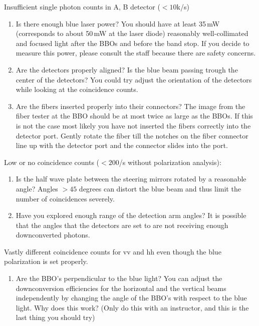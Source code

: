 \documentclass{../lab}
\begin{document}
Insufficient single photon counts in A, B detector ($<10$k/s)

\begin{enumerate}
    \item Is there enough blue laser power? You should have at least 35\,mW (corresponds to about 50\,mW at the laser diode) reasonably well-collimated and focused light after the BBOs and before the band stop. If you decide to measure this power, please consult the staff because there are safety concerns.

    \item Are the detectors properly aligned? Is the blue beam passing trough the center of the detectors? You could try adjust the orientation of the detectors while looking at the coincidence counts.

    \item Are the fibers inserted properly into their connectors? The image from the fiber tester at the BBO should be at most twice as large as the BBOs. If this is not the case most likely you have not inserted the fibers correctly into the detector port. Gently rotate the fiber till the notches on the fiber connector line up with the detector port and the connector slides into the port.
\end{enumerate}

\noindent Low or no coincidence counts ($<200$/s without polarization analysis):

\begin{enumerate}
    \item Is the half wave plate between the steering mirrors rotated by a reasonable angle? Angles $> 45$ degrees can distort the blue beam and thus limit the number of coincidences severely.
    \item Have you explored enough range of the detection arm angles? It is possible that the angles that the detectors are set to are not receiving enough downconverted photons.
\end{enumerate}

\noindent Vastly different coincidence counts for vv and hh even though the blue polarization is set properly.

\begin{enumerate}
    \item Are the BBO's perpendicular to the blue light? You can adjust the downconversion efficiencies for the horizontal and the vertical beams independently by changing the angle of the BBO's with respect to the blue light. Why does this work? (Only do this with an instructor, and this is the last thing you should try)
\end{enumerate}
\end{document}

